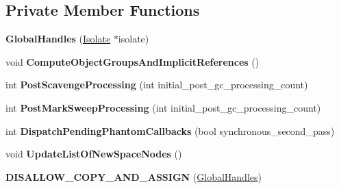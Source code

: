 \subsection*{Private Member Functions}
\begin{DoxyCompactItemize}
\item 
{\bfseries Global\+Handles} (\hyperlink{classv8_1_1internal_1_1_isolate}{Isolate} $\ast$isolate)\hypertarget{classv8_1_1internal_1_1_global_handles_a07078bd4a48f610fbee426815f6d5b94}{}\label{classv8_1_1internal_1_1_global_handles_a07078bd4a48f610fbee426815f6d5b94}

\item 
void {\bfseries Compute\+Object\+Groups\+And\+Implicit\+References} ()\hypertarget{classv8_1_1internal_1_1_global_handles_affc2f5c3ba2c166f4807232a0ce189ee}{}\label{classv8_1_1internal_1_1_global_handles_affc2f5c3ba2c166f4807232a0ce189ee}

\item 
int {\bfseries Post\+Scavenge\+Processing} (int initial\+\_\+post\+\_\+gc\+\_\+processing\+\_\+count)\hypertarget{classv8_1_1internal_1_1_global_handles_a607c87b0e500ca9441b31af6da325978}{}\label{classv8_1_1internal_1_1_global_handles_a607c87b0e500ca9441b31af6da325978}

\item 
int {\bfseries Post\+Mark\+Sweep\+Processing} (int initial\+\_\+post\+\_\+gc\+\_\+processing\+\_\+count)\hypertarget{classv8_1_1internal_1_1_global_handles_ad575c460388df466b7624b21d44e78bb}{}\label{classv8_1_1internal_1_1_global_handles_ad575c460388df466b7624b21d44e78bb}

\item 
int {\bfseries Dispatch\+Pending\+Phantom\+Callbacks} (bool synchronous\+\_\+second\+\_\+pass)\hypertarget{classv8_1_1internal_1_1_global_handles_a45db4b27b83eb52334387a0cd8a6e824}{}\label{classv8_1_1internal_1_1_global_handles_a45db4b27b83eb52334387a0cd8a6e824}

\item 
void {\bfseries Update\+List\+Of\+New\+Space\+Nodes} ()\hypertarget{classv8_1_1internal_1_1_global_handles_a08cbf328ae6780451ed766936e228097}{}\label{classv8_1_1internal_1_1_global_handles_a08cbf328ae6780451ed766936e228097}

\item 
{\bfseries D\+I\+S\+A\+L\+L\+O\+W\+\_\+\+C\+O\+P\+Y\+\_\+\+A\+N\+D\+\_\+\+A\+S\+S\+I\+GN} (\hyperlink{classv8_1_1internal_1_1_global_handles}{Global\+Handles})\hypertarget{classv8_1_1internal_1_1_global_handles_a4f4cc3154678e97d1e5c114406f7ae2e}{}\label{classv8_1_1internal_1_1_global_handles_a4f4cc3154678e97d1e5c114406f7ae2e}

\end{DoxyCompactItemize}
